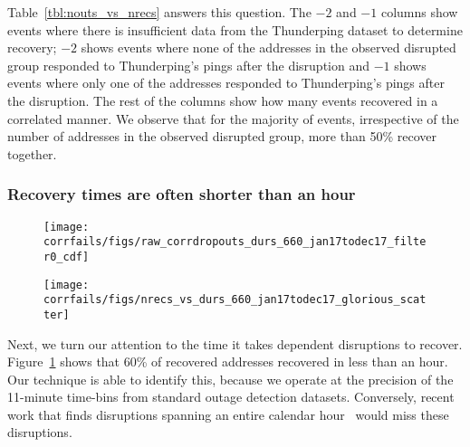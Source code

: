 Table~\ref{tbl:nouts_vs_nrecs} answers this question. The $-2$ and
$-1$ columns show events where there is insufficient data from the
Thunderping dataset to determine recovery; $-2$ shows events where
none of the addresses in the observed disrupted group responded to
Thunderping's pings after the disruption and $-1$ shows events where only
one of the addresses responded to Thunderping's pings after the
disruption. The rest of the columns show how many events recovered in a
correlated manner. We observe that for the majority of events,
irrespective of the number of addresses in the observed disrupted
group, more than 50\% recover together.


\subsubsection*{Recovery times are often shorter than an hour}


\begin{figure*}[t]
\begin{subfigure}[t]{0.47\linewidth}
\centering
\texttt{[image: corrfails/figs/raw\_corrdropouts\_durs\_660\_jan17todec17\_filter0\_cdf]}
\caption{
\label{fig:corrdropouts_durs}
}
\end{subfigure}
%
\hfill
%
\begin{subfigure}[t]{0.47\linewidth}
  \centering
  \texttt{[image: corrfails/figs/nrecs\_vs\_durs\_660\_jan17todec17\_glorious\_scatter]}
  \caption{
    \label{fig:nrecs_vs_durs}
}
\end{subfigure}
%
%
\caption[Durations of dependent disruption events]{
\label{fig:rec_durs}
(a)~The distribution of durations of dependent dropouts for all addresses that
recovered in a correlated manner. 60\% of addresses recovered in less than an hour.
(b)~For dependent dropout events where at least two addresses recovered,
this shows the number of addresses that recovered on the x-axis and the
corresponding recovery duration for the event on the y-axis. Dependent
dropout events vary in their duration irrespective of the number of
affected addresses.
}
\end{figure*}

Next, we turn our attention to the time it takes dependent disruptions
to recover.
%
Figure~\ref{fig:corrdropouts_durs} shows that 60\% of recovered
addresses recovered in less than an hour.
%
Our technique is able to identify this, because we operate at the
precision of the 11-minute time-bins from standard outage detection
datasets.
%
Conversely, recent work that finds disruptions spanning an entire
calendar hour~\cite{advancing-outage-art} would miss these disruptions.


